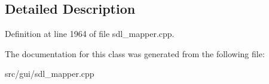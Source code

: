 \subsection{Detailed Description}


Definition at line 1964 of file sdl\-\_\-mapper.\-cpp.



The documentation for this class was generated from the following file\-:\begin{DoxyCompactItemize}
\item 
src/gui/sdl\-\_\-mapper.\-cpp\end{DoxyCompactItemize}
